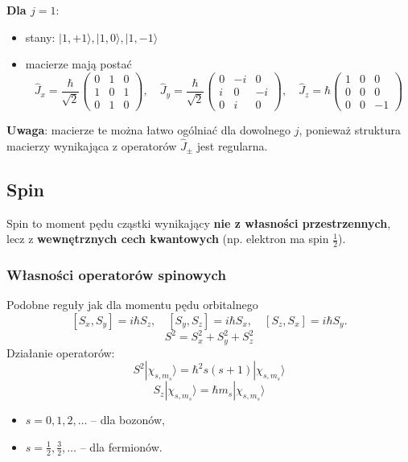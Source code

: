 \textbf{Dla $j = 1$}:
\begin{itemize}
\item stany: $|1, +1\rangle, |1, 0\rangle, |1, -1\rangle$
\item macierze mają postać
$$
\hat{J}_x = \frac{\hbar}{\sqrt{2}} 
\begin{pmatrix}
0 & 1 & 0 \\
1 & 0 & 1 \\
0 & 1 & 0
\end{pmatrix},
\quad
\hat{J}_y = \frac{\hbar}{\sqrt{2}} 
\begin{pmatrix}
0 & -i & 0 \\
i & 0 & -i \\
0 & i & 0
\end{pmatrix},
\quad
\hat{J}_z = \hbar 
\begin{pmatrix}
1 & 0 & 0 \\
0 & 0 & 0 \\
0 & 0 & -1
\end{pmatrix}
$$
\end{itemize}

\textbf{Uwaga}: macierze te można łatwo ogólniać dla dowolnego $j$, ponieważ struktura macierzy wynikająca z operatorów $\hat{J}_\pm$ jest regularna.

\subsection{Spin}
Spin to moment pędu cząstki wynikający \textbf{nie z własności przestrzennych}, lecz z \textbf{wewnętrznych cech kwantowych} (np. elektron ma spin $\frac{1}{2}$).

\subsubsection*{Własności operatorów spinowych}
Podobne reguły jak dla momentu pędu orbitalnego
$$
[S_x, S_y] = i \hbar S_z, \quad [S_y, S_z] = i \hbar S_x, \quad [S_z, S_x] = i \hbar S_y.
$$
$$
S^2 = S_x^2 + S_y^2 + S_z^2
$$
Działanie operatorów:
$$
S^2 | \chi_{s, m_s} \rangle = \hbar^2 s(s+1) | \chi_{s, m_s} \rangle
$$
$$
S_z | \chi_{s, m_s} \rangle = \hbar m_s | \chi_{s, m_s} \rangle
$$
\begin{itemize}
\item $s = 0, 1, 2, \dots$ -- dla bozonów,
\item $s = \frac{1}{2}, \frac{3}{2}, \dots$ -- dla fermionów.
\end{itemize}

